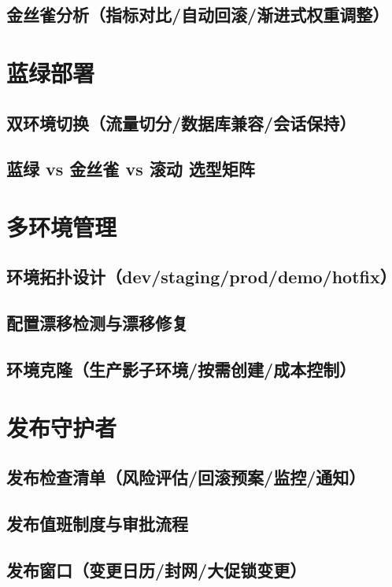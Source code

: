 \documentclass[12pt,UTF8]{ctexbook}
\begin{document}
    \subsection{金丝雀分析（指标对比/自动回滚/渐进式权重调整）}

  \section{蓝绿部署}
    \subsection{双环境切换（流量切分/数据库兼容/会话保持）}
    \subsection{蓝绿 vs 金丝雀 vs 滚动 选型矩阵}

  \section{多环境管理}
    \subsection{环境拓扑设计（dev/staging/prod/demo/hotfix）}
    \subsection{配置漂移检测与漂移修复}
    \subsection{环境克隆（生产影子环境/按需创建/成本控制）}

  \section{发布守护者}
    \subsection{发布检查清单（风险评估/回滚预案/监控/通知）}
    \subsection{发布值班制度与审批流程}
    \subsection{发布窗口（变更日历/封网/大促锁变更）}
\end{document}
